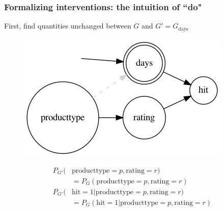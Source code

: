 \begin{frame}
\frametitle{Formalizing interventions: the intuition of ``do"}
	First, find quantities unchanged between $G$ and $G' = G_{\underline{\textrm{days}}}$
         \begin{figure}[ht]
             \includegraphics[height=0.5\textheight]{graphics/do_days}
        \end{figure}
        \vspace{-0.5cm}
        \begin{align}
        P_{G'}( & \textrm{producttype} = p, \textrm{rating} = r) \nonumber \\
        & = P_G( \textrm{producttype} = p, \textrm{rating} = r) \\
        P_{G'}(&\textrm{hit}=1 | \textrm{producttype} = p, \textrm{rating} = r) \nonumber  \\
        & = P_G(\textrm{hit}=1 | \textrm{producttype} = p, \textrm{rating} = r)
        \end{align}
\end{frame}


